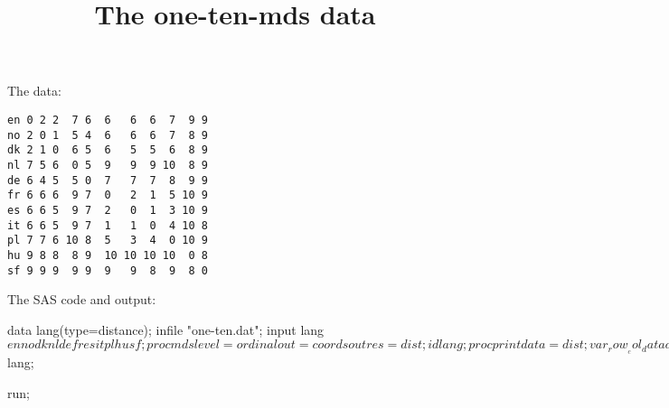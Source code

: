 \documentclass{article}
\title{The one-ten-mds data}
\begin{document}
\maketitle
The data:
\begin{verbatim}
en 0 2 2  7 6  6   6  6  7  9 9
no 2 0 1  5 4  6   6  6  7  8 9
dk 2 1 0  6 5  6   5  5  6  8 9
nl 7 5 6  0 5  9   9  9 10  8 9
de 6 4 5  5 0  7   7  7  8  9 9
fr 6 6 6  9 7  0   2  1  5 10 9
es 6 6 5  9 7  2   0  1  3 10 9
it 6 6 5  9 7  1   1  0  4 10 8
pl 7 7 6 10 8  5   3  4  0 10 9
hu 9 8 8  8 9  10 10 10 10  0 8
sf 9 9 9  9 9  9   9  8  9  8 0
\end{verbatim}
The SAS code and output:
\begin{Winput}
data lang(type=distance);
	infile "one-ten.dat";
	input lang $ en no dk nl de fr es it pl hu sf;

proc mds level=ordinal out=coords outres=dist;
    id lang;

proc print data=dist;
   var _row_ _col_ data distance residual;

proc print data=coords;

proc plot data=coords vpercent=70;
    plot dim2 * dim1 = '*' $ lang;

run;
\end{Winput}
\end{document}
